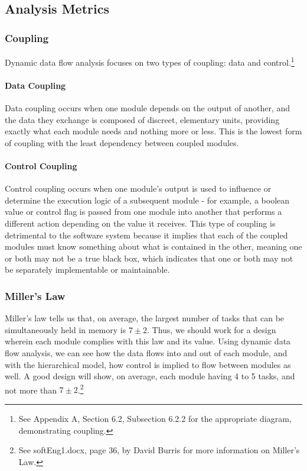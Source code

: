 \documentclass{article}
\begin{document}
	\subsection{Analysis Metrics}
		\subsubsection{Coupling}
			Dynamic data flow analysis focuses on two types of coupling: data and control.\footnote{See Appendix A, Section 6.2, Subsection 6.2.2 for the appropriate diagram, demonstrating coupling.} 
			\paragraph{Data Coupling}
				Data coupling occurs when one module depends on the output of another, and the data they exchange is composed of discreet, elementary units, providing exactly what each module needs and nothing more or less. This is the lowest form of coupling with the least dependency between coupled modules. 
			\paragraph{Control Coupling}
				Control coupling occurs when one module's output is used to influence or determine the execution logic of a subsequent module - for example, a boolean value or control flag is passed from one module into another that performs a different action depending on the value it receives. This type of coupling is detrimental to the software system because it implies that each of the coupled modules must know something about what is contained in the other, meaning one or both may not be a true black box, which indicates that one or both may not be separately implementable or maintainable. 
		\subsubsection{Miller's Law}
			Miller's law tells us that, on average, the largest number of tasks that can be simultaneously held in memory is $7\pm2$. Thus, we should work for a design wherein each module complies with this law and its value. Using dynamic data flow analysis, we can see how the data flows into and out of each module, and with the hierarchical model, how control is implied to flow between modules as well. A good design will show, on average, each module having 4 to 5 tasks, and not more than $7\pm2$.\footnote{See softEng1.docx, page 36, by David Burris for more information on Miller's Law.}  
\end{document}
